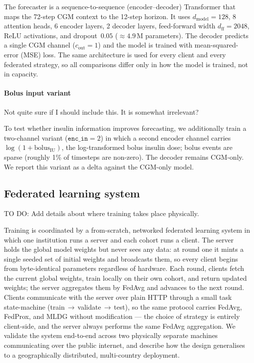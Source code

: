 \documentclass[10pt,letterpaper]{article}
\begin{document}
The forecaster is a sequence-to-sequence (encoder--decoder) Transformer that maps
the 72-step CGM context to the 12-step horizon. It uses
$d_{\text{model}}=128$, 8 attention heads, 6 encoder layers, 2 decoder layers,
feed-forward width $d_{\text{ff}}=2048$, ReLU activations, and dropout~$0.05$
($\approx 4.9$\,M parameters). The decoder predicts a single CGM channel
($c_{\text{out}}=1$) and the model is trained with mean-squared-error (MSE) loss.
The same architecture is used for every client and every federated strategy, so
all comparisons differ only in how the model is trained, not in capacity.

\paragraph{Bolus input variant}

Not quite sure if I should include this. It is somewhat irrelevant?

To test whether insulin information improves forecasting, we additionally train a
two-channel variant ($\texttt{enc\_in}=2$) in which a second encoder channel
carries $\log(1+\mathrm{bolus}_{\mathrm{IU}})$, the log-transformed bolus insulin
dose; bolus events are sparse (roughly 1\% of timesteps are non-zero). The
decoder remains CGM-only. We report this variant as a delta against the
CGM-only model.

\subsection*{Federated learning system}

TO DO: Add details about where training takes place physically.

Training is coordinated by a from-scratch, networked federated learning system
in which one institution runs a server and each cohort runs a client. The server
holds the global model weights but never sees any data: at round one it mints a
single seeded set of initial weights and broadcasts them, so every client begins
from byte-identical parameters regardless of hardware. Each round, clients fetch
the current global weights, train locally on their own cohort, and return updated
weights; the server aggregates them by FedAvg and advances to the next round.
Clients communicate with the server over plain HTTP through a small task
state-machine (train\,$\rightarrow$\,validate\,$\rightarrow$\,test), so the same
protocol carries FedAvg, FedProx, and MLDG without modification --- the choice of
strategy is entirely client-side, and the server always performs the same FedAvg
aggregation. We validate the system end-to-end across two physically separate
machines communicating over the public internet, and describe how the design
generalises to a geographically distributed, multi-country deployment.
\end{document}
